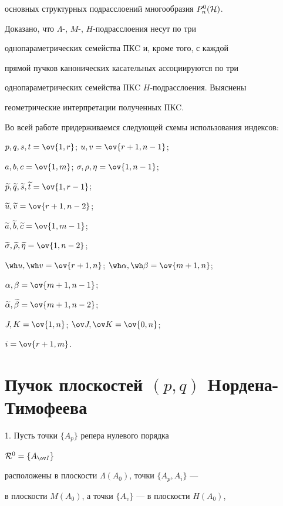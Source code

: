 основных структурных подрасслоений многообразия $P_n^0(\cal H)$.


Доказано, что $\Lambda$-, $M$-, $H$-подрасслоения несут по три


однопараметрических семейства ПКC и, кроме того, с каждой


прямой пучков канонических касательных ассоциируются по три


однопараметрических семейства ПКC $H$-подрасслоения. Выяснены


геометрические интерпретации полученных ПКC.





Во всей работе придерживаемся следующей схемы использования индексов:


$p, q, s, t = \ov{1,r}$; $u, v = \ov{r+1, n-1}$;


$a, b, c = \ov{1,m}$; $\sigma, \rho, \eta = \ov{1,n-1}$;


$\widetilde p, \widetilde q, \widetilde s, \widetilde t = \ov{1,r-1}$;


$\widetilde u, \widetilde v = \ov{r+1,n-2}$;


$\widetilde a, \widetilde b, \widetilde c = \ov{1,m-1}$;


$\widetilde \sigma, \widetilde \rho, \widetilde \eta = \ov{1,n-2}$;


$\wh u, \wh v = \ov{r+1,n}$; $\wh \alpha, \wh \beta = \ov{m+1,n}$;


$\alpha, \beta = \ov{m+1,n-1}$;


$\widetilde \alpha, \widetilde \beta = \ov{m+1,n-2}$;


$J, K= \ov{1,n}$; $\ov J, \ov K = \ov{0,n}$;


$i=\ov{r+1,m}$.








\section{Пучок плоскостей $(p, q)$ Hордена-Тимофеева}





1. Пусть точки $\{ A_p\}$ репера нулевого порядка


${\cal R}^0 =\{ A_{\ov I}\}$


расположены в плоскости $\Lambda(A_0)$, точки $\{ A_p, A_i\}$ ---


в плоскости $M(A_0)$, а точки $\{ A_v\}$ --- в плоскости $H(A_0)$,


